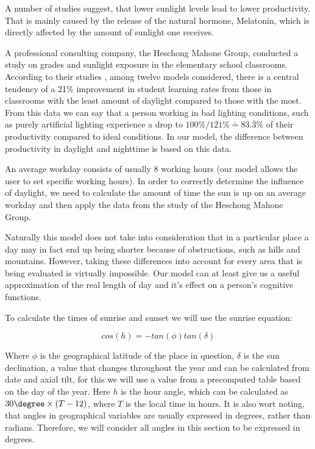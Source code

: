 
A number of studies suggest, that lower sunlight levels lead to lower productivity. That is mainly caused by the release of the natural hormone, Melatonin, which is directly affected by the amount of sunlight one receives.

A professional consulting company, the Heschong Mahone Group, conducted a study on grades and sunlight exposure in the elementary school classrooms. According to their studies \cite{daylight2002}, among twelve models considered, there is a central tendency of a 21\%  improvement in student learning rates from those in classrooms with the least amount of daylight compared to those with the most. From this data we can say that a person working in bad lighting conditions, such as purely artificial lighting experience a drop to $100\%/121\%\doteq83.\overline{3}\%$ of their productivity compared to ideal conditions. In our model, the difference between productivity in daylight and nighttime is based on this data.

An average workday consists of usually 8 working hours (our model allows the user to set specific working hours). In order to correctly determine the influence of daylight, we need to calculate the amount of time the sun is up on an average workday and then apply the data from the study of the Heschong Mahone Group. 

Naturally this model does not take into consideration that in a particular place a day may in fact end up being shorter because of obstructions, such as hills and mountains. However, taking these differences into account for every area that is being evaluated is virtually impossible. Our model can at least give us a useful approximation of the real length of day and it's effect on a person's cognitive functions.

To calculate the times of sunrise and sunset we will use the sunrise equation:

$$cos(h)=-tan(\phi)tan(\delta)$$

Where $\phi$ is the geographical latitude of the place in question, $\delta$ is the sun declination, a value that changes throughout the year and can be calculated from date and axial tilt, for this we will use a value from a precomputed table based on the day of the year. Here $h$ is the hour angle, which can be calculated as $30\degree \times (T-12)$, where $T$ is the local time in hours. It is also wort noting, that angles in geographical variables are usually expressed in degrees, rather than radians. Therefore, we will consider all angles in this section to be expressed in degrees.


